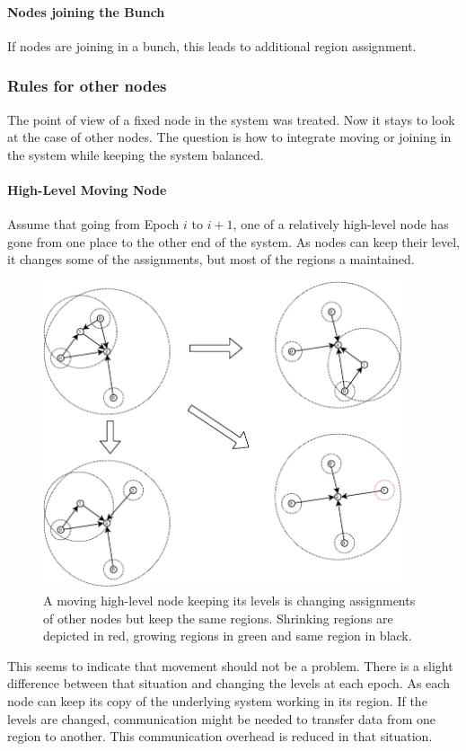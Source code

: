 \documentclass[a4paper,11pt,oneside]{report}
\begin{document}
\paragraph{Nodes joining the Bunch} If nodes are joining in a bunch, this leads
to additional region assignment. 

\subsubsection{Rules for other nodes} The point of view of a fixed node in the
system was treated. Now it stays to look at the case of other nodes. The
question is how to integrate moving or joining in the system while keeping the
system balanced. 

\paragraph{High-Level Moving Node} Assume that going from Epoch $i$ to $i+1$,
one of a relatively high-level node has gone from one place to the other end of
the system. As nodes can keep their level, it changes some of the
assignments, but most of the regions a maintained. 

\begin{figure}[!h] 
\centering
\includegraphics[width=300pt]{figures/LocarnoTreaties-Moving}
\caption{A moving high-level node keeping its levels is changing assignments of other
 nodes but keep the same regions. Shrinking regions are depicted in red,
 growing regions in green and same region in black. }
\label{fig:LocarnoTreaties-Moving}
\end{figure}

This seems to indicate that movement should not be a problem. There is a
slight difference between that situation and changing the levels at each
epoch. As each node can keep its copy of the underlying system working in its
region. If the levels are changed, communication might be needed to transfer
data from one region to another. This communication overhead is reduced in
that situation. 
\end{document}
